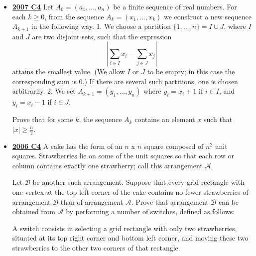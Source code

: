 \documentclass[11pt]{scrartcl}
\begin{document}
\begin{itemize}[leftmargin=*]
Let $ M$ be number of such sequences consisting of $ k$ steps, resulting in the state where lamps $ 1$ through $ n$ are all on, and lamps $ n + 1$ through $ 2n$ are all off, but where none of the lamps $ n + 1$ through $ 2n$ is ever switched on.
Determine $ \frac {N}{M}$. 
\item \href{https://artofproblemsolving.com/community/c6h214669p1186971}{\textbf{2007 C4}} Let $ A_0 = (a_1,\dots,a_n)$ be a finite sequence of real numbers. For each $ k\geqslant  0$, from the sequence $ A_k = (x_1,\dots,x_k)$ we construct a new sequence $ A_{k + 1}$ in the following way.
1. We choose a partition $ \{1,\dots,n\} = I\cup J$, where $ I$ and $ J$ are two disjoint sets, such that the expression
\[ \left|\sum_{i\in I}x_i - \sum_{j\in J}x_j\right|
\]
attains the smallest value. (We allow $ I$ or $ J$ to be empty; in this case the corresponding sum is 0.) If there are several such partitions, one is chosen arbitrarily.
2. We set $ A_{k + 1} = (y_1,\dots,y_n)$ where $ y_i = x_i + 1$ if $ i\in I$, and $ y_i = x_i - 1$ if $ i\in J$.

Prove that for some $ k$, the sequence $ A_k$ contains an element $ x$ such that $\displaystyle{|x|\geqslant \frac n2}$. 
\item \href{https://artofproblemsolving.com/community/c6h155696p874991}{\textbf{2006 C4}} A cake has the form of an $ n$ x $ n$ square composed of $ n^{2}$ unit squares. Strawberries lie on some of the unit squares so that each row or column contains exactly one strawberry; call this arrangement $\mathcal{A}$.

Let $\mathcal{B}$ be another such arrangement. Suppose that every grid rectangle with one vertex at the top left corner of the cake contains no fewer strawberries of arrangement $\mathcal{B}$ than of arrangement $\mathcal{A}$. Prove that arrangement $\mathcal{B}$ can be obtained from $ \mathcal{A}$ by performing a number of switches, defined as follows:

A switch consists in selecting a grid rectangle with only two strawberries, situated at its top right corner and bottom left corner, and moving these two strawberries to the other two corners of that rectangle. 
\end{itemize}
\newpage
\end{document}
